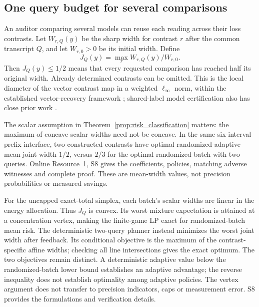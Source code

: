 \subsection{One query budget for several comparisons}
An auditor comparing several models can reuse each reading across their
loss contrasts. Let $W_{r,Q}(y)$ be the sharp width for contrast $r$ after
the common transcript $Q$, and let $W_{r,0}>0$ be its initial width. Define
\[
 J_Q(y)=\max_r W_{r,Q}(y)/W_{r,0}.
\]
Then $J_Q(y)\leq1/2$ means that every requested comparison has reached
half its original width. Already determined contrasts can be omitted.
This is the local diameter of the vector contrast map in a weighted
$\ell_\infty$ norm, within the established vector-recovery framework
\citep{krieg2025}; shared-label model certification also has close prior
work \citep{kuboyama2026}.

The scalar assumption in Theorem~\ref{prop:risk_classification} matters:
the maximum of concave scalar widths need not be concave. In the same
six-interval prefix interface, two constructed contrasts have optimal
randomized-adaptive mean joint width $1/2$, versus $2/3$ for the optimal
randomized batch with two queries. Online Resource~1, S8 gives the
coefficients, policies, matching adverse witnesses and complete proof.
These are mean-width values, not precision probabilities or measured savings.

For the uncapped exact-total simplex, each batch's scalar widths are
linear in the energy allocation. Thus $J_Q$ is convex. Its worst mixture
expectation is attained at a concentration vertex, making the finite-game
LP exact for randomized-batch mean risk. The deterministic two-query
planner instead minimizes the worst joint width after feedback. Its
conditional objective is the maximum of the contrast-specific affine
widths; checking all line intersections gives the exact optimum.
The two objectives remain distinct. A deterministic adaptive value below
the randomized-batch lower bound establishes an adaptive advantage; the
reverse inequality does not establish optimality among adaptive policies.
The vertex argument does not transfer to precision indicators, caps or
measurement error. S8 provides the formulations and verification details.

